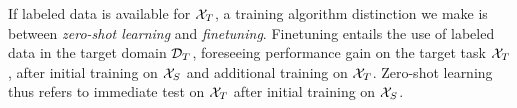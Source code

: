 \begin{description}
%	
\end{description}

If labeled data is available for $\mathcal{X}_T$, a training algorithm distinction we make is between \emph{zero-shot learning} and \emph{finetuning}. Finetuning entails the use of labeled data in the target domain $\mathcal{D}_T$, foreseeing performance gain on the target task $\mathcal{X}_T$, after initial training on $\mathcal{X}_S$ and additional training on $\mathcal{X}_T$. Zero-shot learning thus refers to immediate test on $\mathcal{X}_T$ after initial training on $\mathcal{X}_S$.
